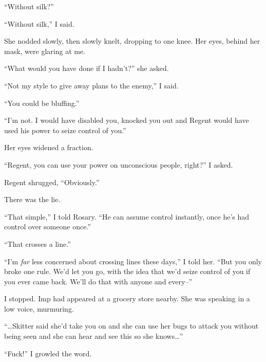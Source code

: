 ``Without silk?''



``Without silk,'' I said.



She nodded slowly, then slowly knelt, dropping to one knee.  Her eyes, behind her mask, were glaring at me.



``What would you have done if I hadn't?'' she asked.



``Not my style to give away plans to the enemy,'' I said.



``You could be bluffing.''



``I'm not.  I would have disabled you, knocked you out and Regent would have used his power to seize control of you.''



Her eyes widened a fraction.



``Regent, you can use your power on unconscious people, right?'' I asked.



Regent shrugged, ``Obviously.''



There was the lie.



``That simple,'' I told Rosary.  ``He can assume control instantly, once he's had control over someone once.''



``That crosses a line.''



``I'm \emph{far} less concerned about crossing lines these days,'' I told her.  ``But you only broke one rule.  We'd let you go, with the idea that we'd seize control of you if you ever came back.  We'll do that with anyone and every--''



I stopped.  Imp had appeared at a grocery store nearby.  She was speaking in a low voice, murmuring.



``\ldots{}Skitter said she'd take you on and she can use her bugs to attack you without being seen and she can hear and see this so she knows\ldots''



``Fuck!'' I growled the word.



